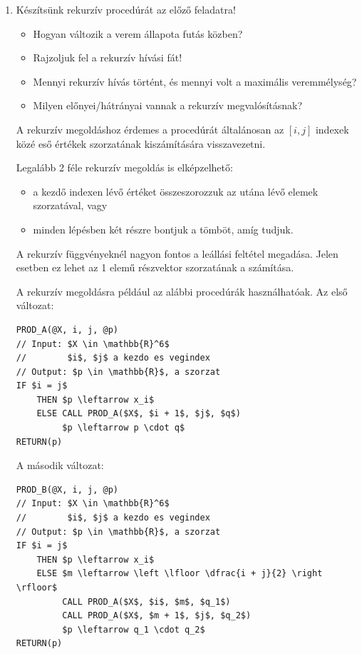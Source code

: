 \documentclass[a4paper]{article}
\newenvironment{solution}
{\color{RoyalBlue}}{\bigskip}
\begin{document}
\begin{enumerate}
\begin{solution}
\end{solution}

\item

Készítsünk rekurzív procedúrát az előző feladatra!
\begin{itemize}
	\item Hogyan változik a verem állapota futás közben?
	\item Rajzoljuk fel a rekurzív hívási fát!
	\item Mennyi rekurzív hívás történt, és mennyi volt a maximális veremmélység?
	\item Milyen előnyei/hátrányai vannak a rekurzív megvalósításnak?
\end{itemize}

\begin{solution}
A rekurzív megoldáshoz érdemes a procedúrát általánosan az $[i, j]$ indexek közé eső értékek szorzatának kiszámítására visszavezetni.

Legalább 2 féle rekurzív megoldás is elképzelhető:
\begin{itemize}
\item[a.] a kezdő indexen lévő értéket összeszorozzuk az utána lévő elemek szorzatával, vagy
\item[b.] minden lépésben két részre bontjuk a tömböt, amíg tudjuk.
\end{itemize}

A rekurzív függvényeknél nagyon fontos a leállási feltétel megadása. Jelen esetben ez lehet az 1 elemű részvektor szorzatának a számítása.

A rekurzív megoldásra például az alábbi procedúrák használhatóak. Az első változat:

\begin{lstlisting}[mathescape]
PROD_A(@X, i, j, @p)
// Input: $X \in \mathbb{R}^6$
//        $i$, $j$ a kezdo es vegindex
// Output: $p \in \mathbb{R}$, a szorzat
IF $i = j$
    THEN $p \leftarrow x_i$
    ELSE CALL PROD_A($X$, $i + 1$, $j$, $q$)
         $p \leftarrow p \cdot q$
RETURN(p)
\end{lstlisting}

A második változat:

\begin{lstlisting}[mathescape]
PROD_B(@X, i, j, @p)
// Input: $X \in \mathbb{R}^6$
//        $i$, $j$ a kezdo es vegindex
// Output: $p \in \mathbb{R}$, a szorzat
IF $i = j$
    THEN $p \leftarrow x_i$
    ELSE $m \leftarrow \left \lfloor \dfrac{i + j}{2} \right \rfloor$
         CALL PROD_A($X$, $i$, $m$, $q_1$)
         CALL PROD_A($X$, $m + 1$, $j$, $q_2$)
         $p \leftarrow q_1 \cdot q_2$
RETURN(p)
\end{lstlisting}


\end{solution}
\end{enumerate}
\end{document}
